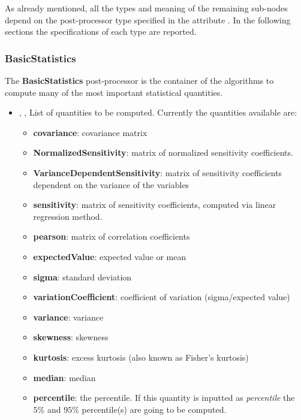 As already mentioned, all the types and meaning of the remaining sub-nodes
depend on the post-processor type specified in the attribute .
%
In the following sections the specifications of each type are reported.

\subsubsection{BasicStatistics}
\label{BasicStatistics}
The \textbf{BasicStatistics} post-processor is the container of the algorithms
to compute many of the most important statistical quantities.
%
\begin{itemize}
  \item {}, ,
  List of quantities to be computed.
  Currently the quantities available are:
  \begin{itemize}
    \item \textbf{covariance}: covariance matrix
    \item \textbf{NormalizedSensitivity}: matrix of normalized sensitivity
    coefficients. 
    \item \textbf{VarianceDependentSensitivity}: matrix of sensitivity coefficients dependent on the variance of the variables
    \item \textbf{sensitivity}: matrix of sensitivity coefficients, computed via linear regression method.
    \item \textbf{pearson}: matrix of correlation coefficients
    \item \textbf{expectedValue}: expected value or mean
    \item \textbf{sigma}: standard deviation
    \item \textbf{variationCoefficient}: coefficient of variation
    (sigma/expected value)
    \item \textbf{variance}: variance
    \item \textbf{skewness}: skewness
    \item \textbf{kurtosis}: excess kurtosis (also known as Fisher's kurtosis)
    \item \textbf{median}: median
    \item \textbf{percentile}: the percentile. If this quantity is inputted as \textit{percentile} the $5\%$ and $95\%$ percentile(s) are going to be computed.

\end{itemize}
\end{itemize}
